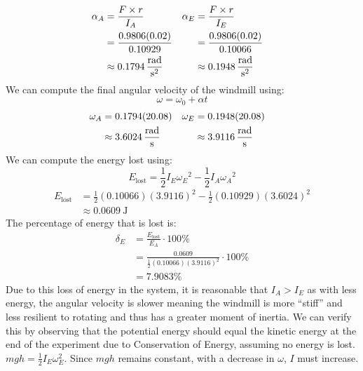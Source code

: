 \documentclass[article, 11pt]{article}
\begin{document}
    \begin{alignat*}{2}
        \begin{aligned}
            \alpha_A  &= \frac{F \times r}{I_A} \\
                      &= \frac{0.9806(0.02)}{0.10929} \\
                      &\approx \SI{0.1794}{\frac{\radian}{\second^2}}
        \end{aligned} \quad &
        \begin{aligned}
            \alpha_E &= \frac{F \times r}{I_E} \\
                     &= \frac{0.9806(0.02)}{0.10066} \\
                     &\approx \SI{0.1948}{\frac{\radian}{\second^2}}
        \end{aligned}
    \end{alignat*}
    We can compute the final angular velocity of the windmill using:
    \begin{equation*}
        \omega = \omega_0 + \alpha t
    \end{equation*}
    \begin{alignat*}{2}
        \begin{aligned}
            \omega_A &= 0.1794(20.08) \\
                     &\approx \SI{3.6024}{\frac{\radian}{\second}}
        \end{aligned} \quad &
        \begin{aligned}
            \omega_E &= 0.1948(20.08) \\
                     &\approx \SI{3.9116}{\frac{\radian}{\second}}
        \end{aligned}
    \end{alignat*}
    We can compute the energy lost using:
    \begin{equation*}
        E_\text{lost} = \frac{1}{2}I_E{\omega_E}^2 - \frac{1}{2}I_A{\omega_A}^2
    \end{equation*}
    \begin{align*}
        E_\text{lost} &= \frac{1}{2}(0.10066)(3.9116)^2 - \frac{1}{2}(0.10929)(3.6024)^2 \\
        &\approx \SI{0.0609}{\joule}
    \end{align*}
    The percentage of energy that is lost is:
    \begin{align*}
        \delta_E &= \frac{E_\text{lost}}{E_A} \cdot 100\% \\
                 &= \frac{0.0609}{\frac{1}{2}(0.10066)(3.9116)^2} \cdot 100\% \\
                 &= 7.9083\%
    \end{align*}
    Due to this loss of energy in the system, it is reasonable that $I_A > I_E$ as with less energy, the angular velocity is slower meaning the windmill is more
    ``stiff'' and less resilient to rotating and thus has a greater moment of inertia. We can verify this by observing that the potential energy should equal the kinetic energy at the end of the experiment due to Conservation of Energy, assuming no energy is lost. $mgh= \frac{1}{2}I_E\omega_E^2$. Since $mgh$ remains constant, with a decrease in $\omega$, $I$ must increase.
\end{document}
